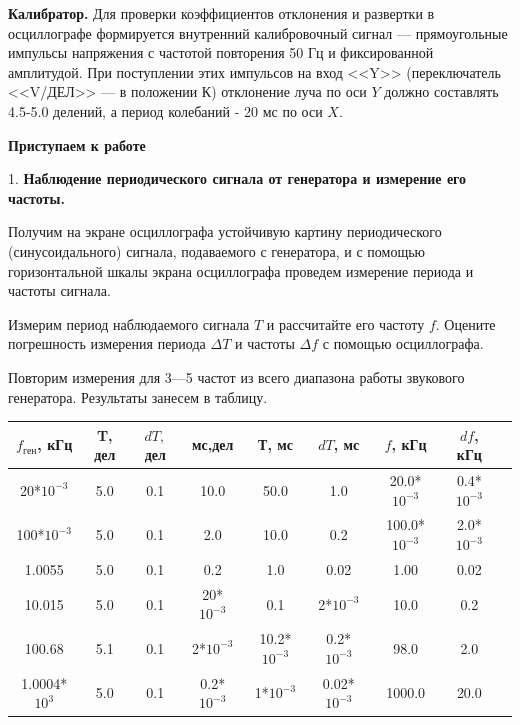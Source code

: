 \documentclass[14pt]{article}
\begin{document}
%
%

\vspace{0.5cm}
\textbf{Калибратор.} Для проверки коэффициентов отклонения и развертки в осциллографе формируется внутренний калибровочный сигнал --- прямоугольные импульсы напряжения с частотой повторения 50 Гц и фиксированной амплитудой. При поступлении этих импульсов на вход <<Y>> (переключатель <<V/ДЕЛ>> --- в положении К) отклонение луча по оси $Y$ должно составлять 4.5-5.0 делений, а период колебаний - 20 мс по оси $X$.

%
%

\vspace{1cm}
\textbf{Приступаем к работе}

\vspace{0.5cm}
1. \textbf{Наблюдение периодического сигнала от генератора и измерение его частоты.} 

Получим на экране осциллографа устойчивую картину периодического (синусоидального) сигнала, подаваемого с генератора, и с помощью горизонтальной шкалы экрана осциллографа проведем измерение периода и частоты сигнала.

Измерим период наблюдаемого сигнала $T$ и рассчитайте его частоту $f$. Оцените погрешность измерения периода $\Delta T$ и частоты $\Delta f$ с помощью осциллографа.

Повторим измерения для 3—5 частот из всего диапазона работы звукового генератора. Результаты занесем в таблицу.


\begin{center}
\begin{tabular}{|c|c|c|c|c|c|c|c|c|}
\hline
$f_\text{ген}$, кГц	&T, дел	&  $dT,$ дел&	мс,дел			&	Т, мс			&	$dT$, мс	&	$f$, кГц		&	$df$, кГц\\
\hline
20*$10^{-3}$				&5.0	&	0.1		&	10.0			&	50.0			&	1.0			&	20.0*$10^{-3}$	&	0.4*$10^{-3}$\\
\hline
100*$10^{-3}$				&5.0	&	0.1		&	2.0				&	10.0			&	0.2			&	100.0*$10^{-3}$	&	2.0*$10^{-3}$\\
\hline
1.0055						&5.0	&	0.1		&	0.2				&	1.0				&	0.02		&	1.00			&	0.02\\
\hline
10.015						&5.0	&	0.1		&	20*$10^{-3}$	&	0.1				&	2*$10^{-3}$	&	10.0			&	0.2\\	
\hline	
100.68						&5.1	&	0.1		&	2*$10^{-3}$		&	10.2*$10^{-3}$	&	0.2*$10^{-3}$&	98.0			&	2.0\\
\hline
1.0004*$10^3$				&5.0	&	0.1		&	0.2*$10^{-3}$	&	1*$10^{-3}$		&	0.02*$10^{-3}$&	1000.0			&	20.0\\
\hline
\end{tabular}
\end{center}
\end{document}
